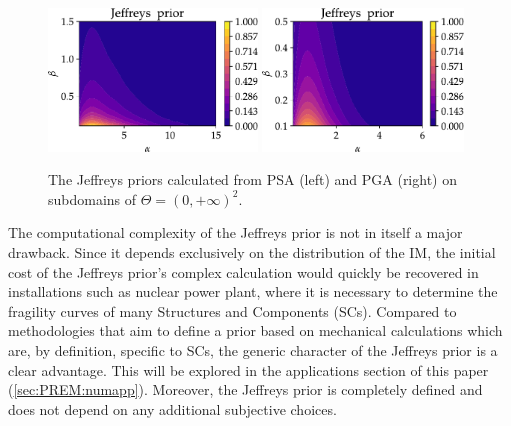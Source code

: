    \begin{figure}[h] %
        \centering
        \includegraphics[height=3.8cm]{figures/PREM/Jeff_prior_PSA-1.pdf}\hspace*{0.5cm}
        \includegraphics[height=3.8cm]{figures/PREM/Jeff_prior_PGA-2.pdf}
        \caption{The Jeffreys priors calculated from PSA (left) and PGA (right) on subdomains of $\Theta=(0,+\infty)^2$.}
        \label{fig:jeff_prior}
    \end{figure}
    







    The computational complexity of the Jeffreys prior is not in itself a major drawback. Since it depends exclusively on the distribution of the IM, the initial cost of the Jeffreys prior’s complex calculation would quickly be recovered in installations such as nuclear power plant, where it is necessary to determine the fragility curves of many Structures and Components (SCs). Compared to methodologies that aim to define a prior based on mechanical calculations which are, by definition, specific to SCs, the generic character of the Jeffreys prior is a clear advantage. This will be explored in the applications section of this paper (\cref{sec:PREM:numapp}). %
    Moreover, the Jeffreys prior is completely defined and does not depend on any additional subjective choices. 
    
